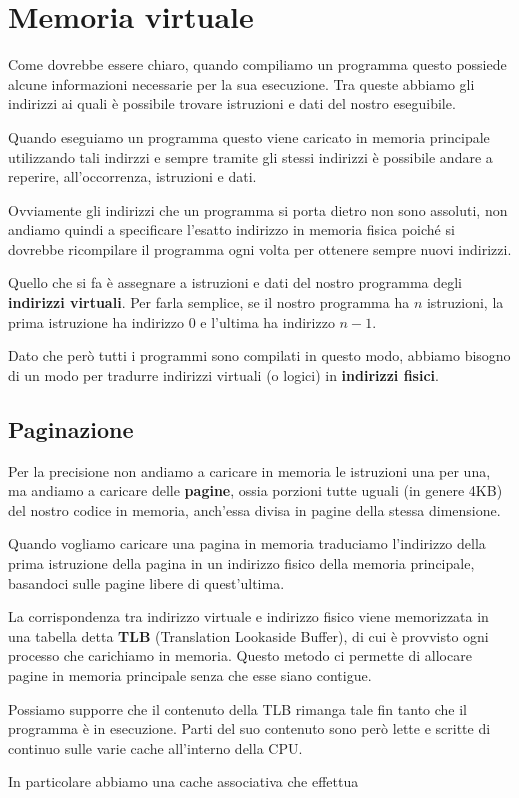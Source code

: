 \section{Memoria virtuale}
Come dovrebbe essere chiaro, quando compiliamo un programma questo possiede alcune informazioni
necessarie per la sua esecuzione. Tra queste abbiamo gli indirizzi ai quali è possibile trovare
istruzioni e dati del nostro eseguibile.

Quando eseguiamo un programma questo viene caricato in memoria principale utilizzando tali indirzzi
e sempre tramite gli stessi indirizzi è possibile andare a reperire, all'occorrenza, istruzioni e
dati.

Ovviamente gli indirizzi che un programma si porta dietro non sono assoluti, non andiamo quindi a
specificare l'esatto indirizzo in memoria fisica poiché si dovrebbe ricompilare il programma ogni
volta per ottenere sempre nuovi indirizzi.

Quello che si fa è assegnare a istruzioni e dati del nostro programma degli
\textbf{indirizzi virtuali}. Per farla semplice, se il nostro programma ha $n$ istruzioni, la prima
istruzione ha indirizzo 0 e l'ultima ha indirizzo $n-1$.

Dato che però tutti i programmi sono compilati in questo modo, abbiamo bisogno di un modo per
tradurre indirizzi virtuali (o logici) in \textbf{indirizzi fisici}.

\subsection{Paginazione}
Per la precisione non andiamo a caricare in memoria le istruzioni una per una, ma andiamo a caricare
delle \textbf{pagine}, ossia porzioni tutte uguali (in genere 4KB) del nostro codice in memoria,
anch'essa divisa in pagine della stessa dimensione.

Quando vogliamo caricare una pagina in memoria traduciamo l'indirizzo della prima istruzione della
pagina in un indirizzo fisico della memoria principale, basandoci sulle pagine libere di
quest'ultima.

La corrispondenza tra indirizzo virtuale e indirizzo fisico viene memorizzata in una tabella detta
\textbf{TLB} (Translation Lookaside Buffer), di cui è provvisto ogni processo che carichiamo in
memoria. Questo metodo ci permette di allocare pagine in memoria principale senza che esse siano
contigue.

Possiamo supporre che il contenuto della TLB rimanga tale fin tanto che il programma è in
esecuzione. Parti del suo contenuto sono però lette e scritte di continuo sulle varie cache
all'interno della CPU.

In particolare abbiamo una cache associativa che effettua